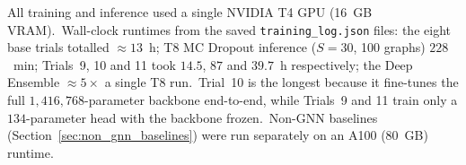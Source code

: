 All training and inference used a single NVIDIA T4 GPU (16~GB VRAM).\ Wall-clock runtimes from the saved \texttt{training\_log.json} files: the eight base trials totalled $\approx 13$~h; T8 MC Dropout inference ($S=30$, 100 graphs) $228$~min; Trials~9, 10 and 11 took $14.5$, $87$ and $39.7$~h respectively; the Deep Ensemble $\approx 5\times$ a single T8 run.\ Trial~10 is the longest because it fine-tunes the full $1{,}416{,}768$-parameter backbone end-to-end, while Trials~9 and 11 train only a $134$-parameter head with the backbone frozen.\ Non-GNN baselines (Section~\ref{sec:non_gnn_baselines}) were run separately on an A100 (80~GB) runtime.
